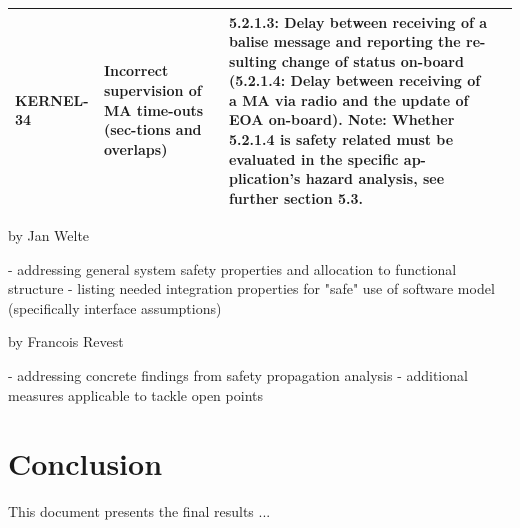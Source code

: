 \documentclass{template/openetcs_report}
\begin{document}
\begin{center}
\begin{supertabular}[H]{|p{2cm}|p{4cm}|p{4cm}|p{4cm}|}
\hline KERNEL-34 & Incorrect supervision of MA time-outs (sec-tions and overlaps) & 
5.2.1.3: Delay between receiving of a balise message and reporting the re-sulting change of status on-board
(5.2.1.4: Delay between receiving of a MA via radio and the update of EOA on-board).
Note: Whether 5.2.1.4 is safety related must be evaluated in the specific ap-plication’s hazard analysis, see further section 5.3.  &  \\
\hline 
\end{supertabular} 
\end{center}

by Jan Welte

- addressing general system safety properties and allocation to functional structure
- listing needed integration properties for "safe" use of software model (specifically interface assumptions)

by Francois Revest

- addressing concrete findings from safety propagation analysis
- additional measures applicable to tackle open points


\chapter{Conclusion}
\label{sec:conclusion}

This document presents the final results ...





\end{document}
